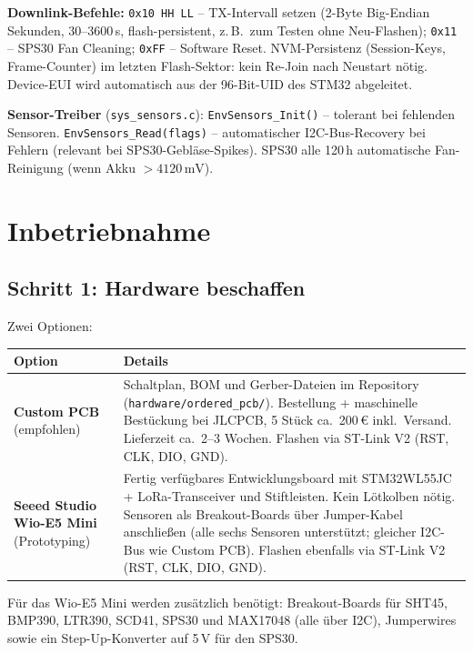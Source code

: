 \documentclass[11pt,a4paper]{scrartcl}
\begin{document}
\textbf{Downlink-Befehle:} \texttt{0x10\,HH\,LL} – TX-Intervall setzen (2-Byte Big-Endian Sekunden, 30--3600\,s, flash-persistent, z.\,B.\ zum Testen ohne Neu-Flashen); \texttt{0x11} – SPS30 Fan Cleaning; \texttt{0xFF} – Software Reset. NVM-Persistenz (Session-Keys, Frame-Counter) im letzten Flash-Sektor: kein Re-Join nach Neustart nötig. Device-EUI wird automatisch aus der 96-Bit-UID des STM32 abgeleitet.

\textbf{Sensor-Treiber} (\texttt{sys\_sensors.c}): \texttt{EnvSensors\_Init()} – tolerant bei fehlenden Sensoren. \texttt{EnvSensors\_Read(flags)} – automatischer I2C-Bus-Recovery bei Fehlern (relevant bei SPS30-Gebläse-Spikes). SPS30 alle 120\,h automatische Fan-Reinigung (wenn Akku $> 4120\,\text{mV}$).

\clearpage
\section{Inbetriebnahme}

\subsection*{Schritt 1: Hardware beschaffen}

Zwei Optionen:

\begin{table}[H]
  \centering
  \small
  \begin{tabularx}{\textwidth}{lX}
    \hline
    \textbf{Option} & \textbf{Details} \\
    \hline
    \textbf{Custom PCB} (empfohlen) &
      Schaltplan, BOM und Gerber-Dateien im Repository (\texttt{hardware/ordered\_pcb/}).
      Bestellung + maschinelle Bestückung bei JLCPCB, 5 Stück ca.~200\,€ inkl.\ Versand.
      Lieferzeit ca.\ 2–3 Wochen. Flashen via ST-Link V2 (RST, CLK, DIO, GND). \\[4pt]
    \textbf{Seeed Studio Wio-E5 Mini} (Prototyping) &
      Fertig verfügbares Entwicklungsboard mit STM32WL55JC + LoRa-Transceiver und
      Stiftleisten. Kein Lötkolben nötig. Sensoren als Breakout-Boards über
      Jumper-Kabel anschließen (alle sechs Sensoren unterstützt; gleicher I2C-Bus
      wie Custom PCB). Flashen ebenfalls via ST-Link V2 (RST, CLK, DIO, GND). \\
    \hline
  \end{tabularx}
\end{table}

Für das Wio-E5 Mini werden zusätzlich benötigt: Breakout-Boards für SHT45, BMP390, LTR390, SCD41, SPS30 und MAX17048 (alle über I2C), Jumperwires sowie ein Step-Up-Konverter auf 5\,V für den SPS30.
\end{document}
